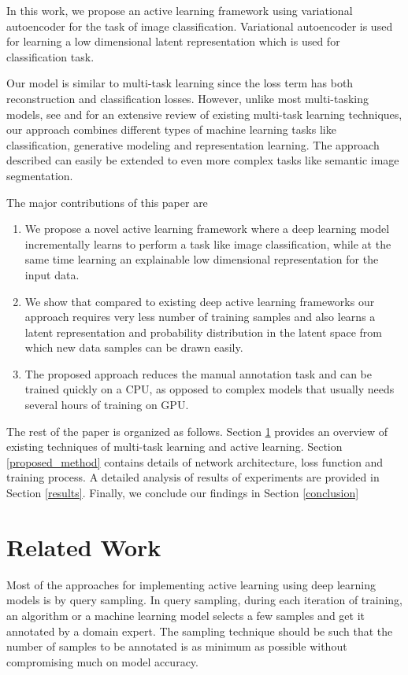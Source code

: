 \documentclass{uai2021} %
\begin{document}
In this work, we propose an active learning framework using variational autoencoder for the task of  image classification.
Variational autoencoder is used for learning a low dimensional latent representation which is used for classification task.

Our model is similar to multi-task learning since the loss term has both reconstruction and classification losses.
However, unlike most multi-tasking models, see \cite{rudeir2017overview} and \cite{crawshaw2020multi} for an extensive review of existing multi-task learning techniques, our approach combines  different types of machine learning tasks like classification, generative modeling and representation learning. The approach described can easily be extended to even more complex tasks like semantic image segmentation.

The major contributions of this paper are
\begin{enumerate}
    \item We propose a novel active learning framework where a  deep learning model incrementally learns to perform a task like image classification, while at the same time learning an explainable low dimensional representation for the input data.
    \item We show that compared to existing deep active learning frameworks our approach requires very less number of training samples and also learns a latent representation and  probability distribution in the latent space from which new data samples can be drawn easily.
    \item The proposed approach reduces the manual annotation task and can be trained quickly on a CPU, as opposed to complex models that usually needs several hours of training on GPU.
\end{enumerate}

The rest of the paper is organized as follows.
Section \ref{related_works} provides an overview of existing techniques of multi-task learning and active learning.
Section \ref{proposed_method} contains details of network architecture, loss function and training process.
A detailed analysis of results of experiments are provided in Section \ref{results}.
Finally, we conclude our findings in Section \ref{conclusion}

\section{Related Work} \label{related_works}
Most of the approaches for implementing active learning using deep learning models is by query sampling.
In query sampling, during each iteration of training, an algorithm or a machine learning model selects a few samples and get it annotated by a domain expert\cite{sinha2019variational}\cite{sener2017active}.
The sampling technique should be such that the number of samples to be annotated is as minimum as possible without compromising much on model accuracy.
\end{document}

